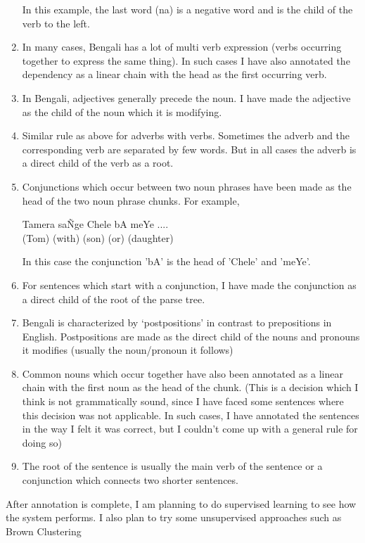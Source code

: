 \documentclass[11pt,letterpaper]{article}
\begin{document}
\begin{enumerate}
\begin{center}
\end{center}
 In this example, the last word (na) is a negative word and is the child of the verb to the left. 
\item In many cases, Bengali has a lot of multi verb expression (verbs occurring together to express the same thing). In such cases I have also annotated the dependency as a linear chain with the head as the first occurring verb. 
\item In Bengali, adjectives generally precede the noun. I have made the adjective as the child of the noun which it is modifying. 
\item Similar rule as above for adverbs with verbs. Sometimes the adverb and the corresponding verb are separated by few words. But in all cases the adverb is a direct child of the verb as a root.
\item Conjunctions which occur between two noun phrases have been made as the head of the two noun phrase chunks. For example, \\
\begin{center}
Tamera sa\~ Nge Chele bA meYe ....\\
(Tom)     (with)    (son)  (or) (daughter)
\end{center}
In this case the conjunction 'bA' is the head of 'Chele' and 'meYe'. 
\item For sentences which start with a conjunction, I have made the conjunction as a direct child of the root of the parse tree.
\item Bengali is characterized by `postpositions' in contrast to prepositions in English. Postpositions are made as the direct child of the nouns and pronouns it modifies (usually the noun/pronoun it follows)
\item Common nouns which occur together have also been annotated as a linear chain with the first noun as the head of the chunk. (This is a decision which I think is not grammatically sound, since I have faced some sentences where this decision was not applicable. In such cases, I have annotated the sentences in the way I felt it was correct, but I couldn't come up with a general rule for doing so)
\item The root of the sentence is usually the main verb of the sentence or a conjunction which connects two shorter sentences.
\end{enumerate}

After annotation is complete, I am planning to do supervised learning to see how the system performs. I also plan to try some unsupervised approaches such as Brown Clustering \citep{Brown92class-basedn-gram}
\end{document}
